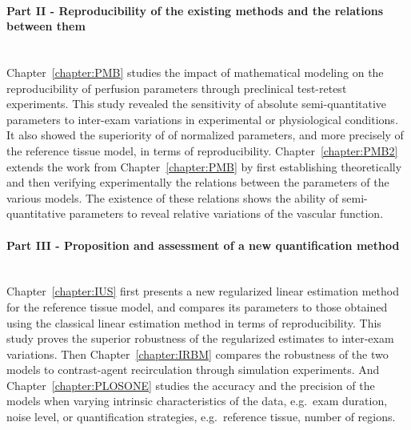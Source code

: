 \paragraph{Part II - Reproducibility of the existing methods and the relations between them}\\
Chapter~\ref{chapter:PMB} studies the impact of mathematical modeling on the reproducibility of perfusion parameters through preclinical test-retest experiments.
This study revealed the sensitivity of absolute semi-quantitative parameters to inter-exam variations in experimental or physiological conditions.
It also showed the superiority of of normalized parameters, and more precisely of the reference tissue model, in terms of reproducibility.
Chapter~\ref{chapter:PMB2} extends the work from Chapter~\ref{chapter:PMB} by first establishing theoretically and then verifying experimentally the relations between the parameters of the various models.
The existence of these relations shows the ability of semi-quantitative parameters to reveal relative variations of the vascular function.

\paragraph{Part III - Proposition and assessment of a new quantification method}\\
Chapter~\ref{chapter:IUS} first presents a new regularized linear estimation method for the reference tissue model, and compares its parameters to those obtained using the classical linear estimation method in terms of reproducibility.
This study proves the superior robustness of the regularized estimates to inter-exam variations.
Then Chapter~\ref{chapter:IRBM} compares the robustness of the two models to contrast-agent recirculation through simulation experiments.
And Chapter~\ref{chapter:PLOSONE} studies the accuracy and the precision of the models when varying intrinsic characteristics of the data, e.g.~exam duration, noise level, or quantification strategies, e.g.~reference tissue, number of regions.

\newpage


